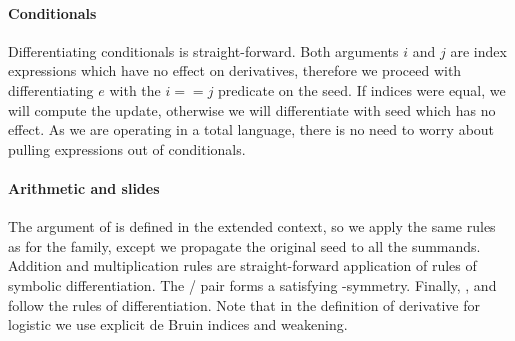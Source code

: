 \paragraph{Conditionals} Differentiating
conditionals is straight-forward.  Both arguments $i$ and $j$ are index expressions
which have no effect on derivatives, therefore we proceed with 
differentiating $e$ with the $i == j$ predicate on the seed.  If indices were equal,
we will compute the update, otherwise we will differentiate with seed  which
has no effect.  As we are operating in a total language, there is no need to worry
about pulling expressions out of conditionals.

\paragraph{Arithmetic and slides} The argument of  is defined in the
extended context, so we apply the same rules as for the  family,
except we propagate the original seed to all the summands.  Addition and
multiplication rules are straight-forward application of rules of symbolic
differentiation. The / pair forms a satisfying
-symmetry.  Finally, ,  and  follow
the rules of differentiation.  Note that in the definition of derivative
for logistic we use explicit de Bruin indices and weakening.


